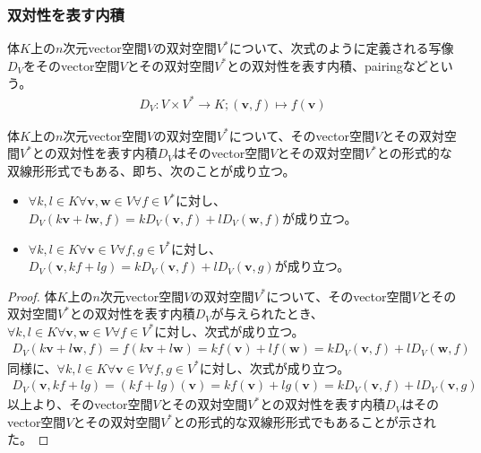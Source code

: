 \documentclass[dvipdfmx]{jsarticle}
\begin{document}
\subsubsection{双対性を表す内積}%
\begin{dfn}
体$K$上の$n$次元vector空間$V$の双対空間$V^{*}$について、次式のように定義される写像$D_{V}$をそのvector空間$V$とその双対空間$V^{*}$との双対性を表す内積、pairingなどという。
\begin{align*}
D_{V}:V \times V^{*} \rightarrow K;\left( \mathbf{v},f \right) \mapsto f\left( \mathbf{v} \right)
\end{align*}
\end{dfn}
\begin{thm}\label{2.4.3.10}
体$K$上の$n$次元vector空間$V$の双対空間$V^{*}$について、そのvector空間$V$とその双対空間$V^{*}$との双対性を表す内積$D_{V}$はそのvector空間$V$とその双対空間$V^{*}$との形式的な双線形形式でもある、即ち、次のことが成り立つ。
\begin{itemize}
\item
  $\forall k,l \in K\forall\mathbf{v},\mathbf{w} \in V\forall f \in V^{*}$に対し、$D_{V}\left( k\mathbf{v} + l\mathbf{w},f \right) = kD_{V}\left( \mathbf{v},f \right) + lD_{V}\left( \mathbf{w},f \right)$が成り立つ。
\item
  $\forall k,l \in K\forall\mathbf{v} \in V\forall f,g \in V^{*}$に対し、$D_{V}\left( \mathbf{v},kf + lg \right) = kD_{V}\left( \mathbf{v},f \right) + lD_{V}\left( \mathbf{v},g \right)$が成り立つ。
\end{itemize}
\end{thm}
\begin{proof}
体$K$上の$n$次元vector空間$V$の双対空間$V^{*}$について、そのvector空間$V$とその双対空間$V^{*}$との双対性を表す内積$D_{V}$が与えられたとき、$\forall k,l \in K\forall\mathbf{v},\mathbf{w} \in V\forall f \in V^{*}$に対し、次式が成り立つ。
\begin{align*}
D_{V}\left( k\mathbf{v} + l\mathbf{w},f \right) = f\left( k\mathbf{v} + l\mathbf{w} \right) = kf\left( \mathbf{v} \right) + lf\left( \mathbf{w} \right) = kD_{V}\left( \mathbf{v},f \right) + lD_{V}\left( \mathbf{w},f \right)
\end{align*}
同様に、$\forall k,l \in K\forall\mathbf{v} \in V\forall f,g \in V^{*}$に対し、次式が成り立つ。
\begin{align*}
D_{V}\left( \mathbf{v},kf + lg \right) = (kf + lg)\left( \mathbf{v} \right) = kf\left( \mathbf{v} \right) + lg\left( \mathbf{v} \right) = kD_{V}\left( \mathbf{v},f \right) + lD_{V}\left( \mathbf{v},g \right)
\end{align*}
以上より、そのvector空間$V$とその双対空間$V^{*}$との双対性を表す内積$D_{V}$はそのvector空間$V$とその双対空間$V^{*}$との形式的な双線形形式でもあることが示された。
\end{proof}
\end{document}
